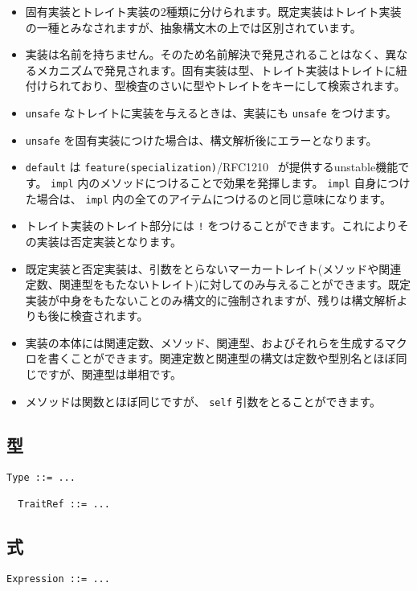 \documentclass[dvipdfmx,uplatex,papersize,a4paper,10pt]{jsbook}
\theoremstyle{definition}
\begin{document}
\begin{itemize}
  \item 固有実装とトレイト実装の2種類に分けられます。既定実装はトレイト実装の一種とみなされますが、抽象構文木の上では区別されています。
  \item 実装は名前を持ちません。そのため名前解決で発見されることはなく、異なるメカニズムで発見されます。固有実装は型、トレイト実装はトレイトに紐付けられており、型検査のさいに型やトレイトをキーにして検索されます。
  \item \verb|unsafe| なトレイトに実装を与えるときは、実装にも \verb|unsafe| をつけます。
  \item \verb|unsafe| を固有実装につけた場合は、構文解析後にエラーとなります。
  \item \verb|default| は \verb|feature(specialization)|/RFC1210~\cite{RustRFC1210} が提供するunstable機能です。 \verb|impl| 内のメソッドにつけることで効果を発揮します。 \verb|impl| 自身につけた場合は、 \verb|impl| 内の全てのアイテムにつけるのと同じ意味になります。
  \item トレイト実装のトレイト部分には \verb|!| をつけることができます。これによりその実装は否定実装となります。
  \item 既定実装と否定実装は、引数をとらないマーカートレイト(メソッドや関連定数、関連型をもたないトレイト)に対してのみ与えることができます。既定実装が中身をもたないことのみ構文的に強制されますが、残りは構文解析よりも後に検査されます。
  \item 実装の本体には関連定数、メソッド、関連型、およびそれらを生成するマクロを書くことができます。関連定数と関連型の構文は定数や型別名とほぼ同じですが、関連型は単相です。
  \item メソッドは関数とほぼ同じですが、 \verb|self| 引数をとることができます。
\end{itemize}

\subsection{型}

\begin{lstlisting}[language=BNFLike, gobble=2]
  Type ::= ...

  TraitRef ::= ...
\end{lstlisting}

\subsection{式}

\begin{lstlisting}[language=BNFLike, gobble=2]
  Expression ::= ...
\end{lstlisting}
\end{document}
